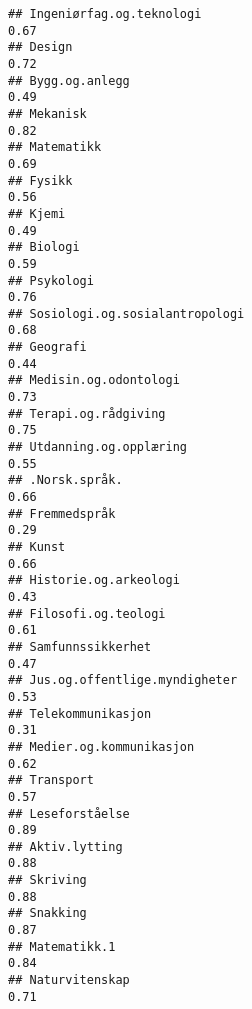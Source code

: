 \documentclass[
]{article}
\begin{document}
\begin{verbatim}
## Ingeniørfag.og.teknologi                                                         0.67
## Design                                                                           0.72
## Bygg.og.anlegg                                                                   0.49
## Mekanisk                                                                         0.82
## Matematikk                                                                       0.69
## Fysikk                                                                           0.56
## Kjemi                                                                            0.49
## Biologi                                                                          0.59
## Psykologi                                                                        0.76
## Sosiologi.og.sosialantropologi                                                   0.68
## Geografi                                                                         0.44
## Medisin.og.odontologi                                                            0.73
## Terapi.og.rådgiving                                                              0.75
## Utdanning.og.opplæring                                                           0.55
## .Norsk.språk.                                                                    0.66
## Fremmedspråk                                                                     0.29
## Kunst                                                                            0.66
## Historie.og.arkeologi                                                            0.43
## Filosofi.og.teologi                                                              0.61
## Samfunnssikkerhet                                                                0.47
## Jus.og.offentlige.myndigheter                                                    0.53
## Telekommunikasjon                                                                0.31
## Medier.og.kommunikasjon                                                          0.62
## Transport                                                                        0.57
## Leseforståelse                                                                   0.89
## Aktiv.lytting                                                                    0.88
## Skriving                                                                         0.88
## Snakking                                                                         0.87
## Matematikk.1                                                                     0.84
## Naturvitenskap                                                                   0.71

\end{verbatim}
\end{document}
